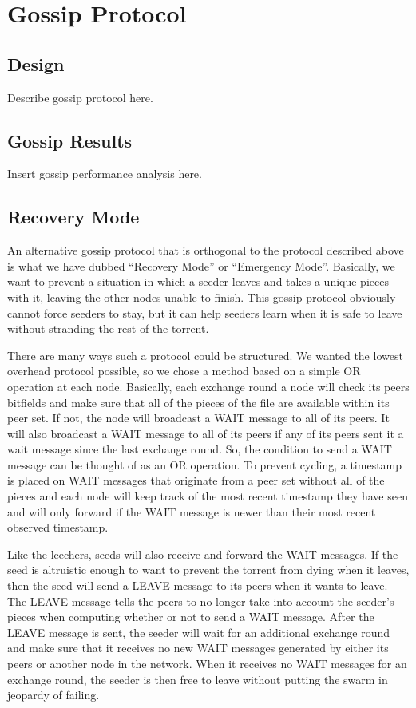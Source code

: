 \section{Gossip Protocol}

\subsection{Design}

Describe gossip protocol here.

\subsection{Gossip Results}

Insert gossip performance analysis here.

\subsection{Recovery Mode}

An alternative gossip protocol that is orthogonal to the protocol described above is 
what we have dubbed ``Recovery Mode'' or ``Emergency Mode''. Basically, we
want to prevent a situation in which a seeder leaves and takes a unique pieces
with it, leaving the other nodes unable to finish. This gossip protocol obviously
cannot force seeders to stay, but it can help seeders learn when it is safe to
leave without stranding the rest of the torrent. 

There are many ways such a protocol could be structured. We wanted the lowest
overhead protocol possible, so we chose a method based on a simple OR operation
at each node. Basically, each exchange round a node will check its peers bitfields
and make sure that all of the pieces of the file are available within its peer
set. If not, the node will broadcast a WAIT message to all of its peers. It will
also broadcast a WAIT message to all of its peers if any of its peers sent it a 
wait message since the last exchange round. So, the condition to send a WAIT message 
can be thought of as an OR operation. To prevent cycling, a timestamp is placed
on WAIT messages that originate from a peer set without all of the pieces and each
node will keep track of the most recent timestamp they have seen and will only forward if
the WAIT message is newer than their most recent observed timestamp.

Like the leechers, seeds will also receive and forward the WAIT messages. If the 
seed is altruistic enough to want to prevent the torrent from dying when it leaves,
then the seed will send a LEAVE message to its peers when it wants to leave. The LEAVE
message tells the peers to no longer take into account the seeder's pieces when computing
whether or not to send a WAIT message. After the LEAVE message is sent, the seeder will
wait for an additional exchange round and make sure that it receives no new WAIT messages
generated by either its peers or another node in the network. When it receives no WAIT
messages for an exchange round, the seeder is then free to leave without putting the 
swarm in jeopardy of failing. 

